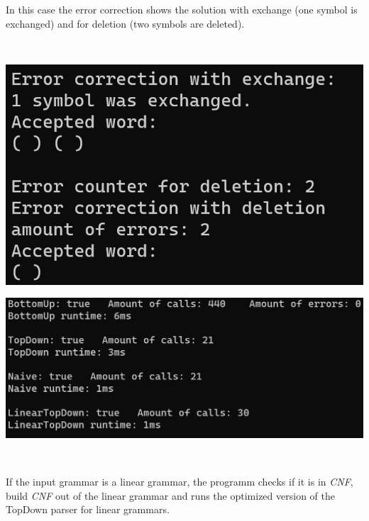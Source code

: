 \documentclass[a4paper, 11pt]{article}
\begin{document}
\begin{minipage}{0.35\textwidth}
In this case the error correction shows the solution with exchange (one symbol is exchanged) and for deletion (two symbols are deleted).

\end{minipage}\begin{minipage}{0.1\textwidth}
\ 
\end{minipage}\begin{minipage}{0.55\textwidth}
\includegraphics[scale=0.7]{images/terminal_4.png}
\end{minipage}

\begin{minipage}{0.5\textwidth}
\includegraphics[scale=0.55]{images/terminal_5.png}
\end{minipage}\begin{minipage}{0.1\textwidth}
\ 
\end{minipage}\begin{minipage}{0.4\textwidth}
If the input grammar is a linear grammar, the programm checks if it is in \textit{CNF}, build \textit{CNF} out of the linear grammar and runs the optimized version of the TopDown parser for linear grammars.
\end{minipage}
\end{document}
